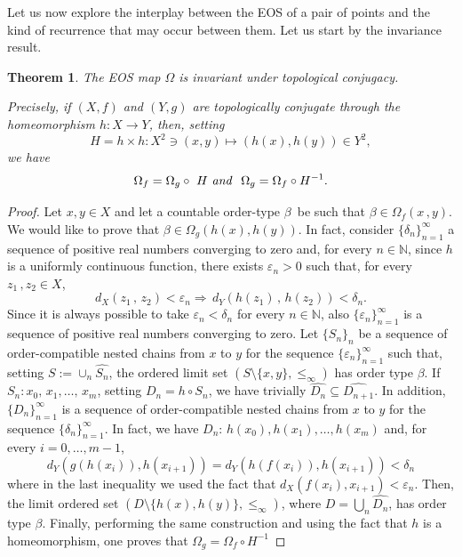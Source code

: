 \documentclass[10pt,a4paper]{article}
\theoremstyle{definition}
\theoremstyle{remark}
\theoremstyle{plain}
\newtheorem{thm}[defi]{Theorem}
\begin{document}


Let us now explore the interplay between the EOS of a pair of points and the kind of recurrence that may occur between them. 
Let us start by the invariance result.


\begin{thm}\label{conj__}
The EOS map $\Omega$ is invariant under topological conjugacy. 

Precisely, if $(X,f)$ and $(Y,g)$ are topologically conjugate through the homeomorphism $h:X\to Y$, then, setting $$H=h\times h:X^2\ni (x,y)\mapsto (h(x),h(y))\in Y^2,$$ we have $$\Omega_f=\Omega_g\circ\  H\text{ \emph{and} }\ \Omega_g= \Omega_f\circ H^{-1}.$$
\end{thm}
\begin{proof}
Let $x,y\in X$ and let a countable order-type $\beta$\ be such that $\beta\in \Omega_f (x\, ,y)$. We would like to prove that $\beta\in\Omega_g(h(x),h(y))$. In fact, consider $\{\delta_n\}_{n=1}^\infty$  a sequence of positive real numbers converging to zero and, for every $n\in\mathbb{N}$, since $h$ is a uniformly continuous function, there exists $\varepsilon_n>0$ such that, for every $z_1\, ,z_2 \in X$, $$d_X(z_1\,,\,z_2)<\varepsilon_n \Rightarrow\, d_Y (h(z_1)\, ,\, h(z_2))<\delta_n.$$ Since it is always possible to take $\varepsilon_n<\delta_n$ for every $n\in \mathbb{N}$, also $\{\varepsilon_n\}_{n=1}^\infty$ is  a sequence of positive real numbers converging to zero. Let $\{S_n\}_n$ be a sequence of order-compatible nested chains from $x$ to $y$ for the sequence $\{\varepsilon_n\}_{n=1}^\infty$ such that, setting $S:=\cup_n \widehat{S_n}$, the ordered limit set $(S\setminus\{x,y\},\leq_\infty)$ has order type $\beta$. If $S_n: x_0,\,x_1,\dots,\,x_m$, setting $D_n=h\circ S_n$, we have trivially $\widehat{D_n}\subseteq \widehat{D_{n+1}}$. In addition, $\{D_n\}_{n=1}^{\infty}$ is a sequence of order-compatible nested chains from $x$ to $y$ for the sequence $\{\delta_n\}_{n=1}^\infty$. In fact, we have $D_n:\,h({x_0}),h({x_1}),\dots,h({x_m})$ and, for every $i=0,\dots,m-1$,  $$d_Y(g(h({x_i})),h(x_{i+1}))=d_Y(h(f({x_i})),h(x_{i+1}))<\delta_n$$ where in the last inequality we used the fact that $d_X(f({x_i}),x_{i+1})<\varepsilon_n.$ Then, the limit ordered set $(D\setminus\{h(x),h(y)\},\leq_\infty)$, where $D=\bigcup_n \widehat{D_n}$, has order type $\beta$. Finally, performing the same construction and using the fact that $h$ is a homeomorphism, one proves that $\Omega_g= \Omega_f\circ H^{-1}$
\end{proof}
\end{document}
